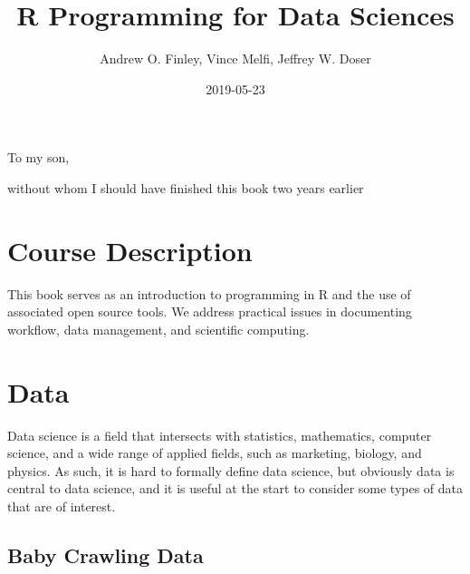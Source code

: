 \documentclass[]{krantz}
\title{R Programming for Data Sciences}
\author{Andrew O. Finley, Vince Melfi, Jeffrey W. Doser}
\date{2019-05-23}
\begin{document}
\maketitle


\thispagestyle{empty}

\begin{center}
To my son,

without whom I should have finished this book two years earlier
\end{center}

\setlength{\abovedisplayskip}{-5pt}
\setlength{\abovedisplayshortskip}{-5pt}

{
\hypersetup{linkcolor=}
\setcounter{tocdepth}{2}
\tableofcontents
}
\listoftables
\listoffigures
\hypertarget{course-description}{%
\chapter*{Course Description}\label{course-description}}


This book serves as an introduction to programming in R and the use of associated open source tools. We address practical issues in documenting workflow, data management, and scientific computing.

\mainmatter

\hypertarget{data}{%
\chapter{Data}\label{data}}

Data science is a field that intersects with statistics, mathematics, computer science, and a wide range of applied fields, such as marketing, biology, and physics. As such, it is hard to formally define data science, but obviously data is central to data science, and it is useful at the start to consider some types of data that are of interest.

\hypertarget{baby-crawling-data}{%
\section{Baby Crawling Data}\label{baby-crawling-data}}
\end{document}
